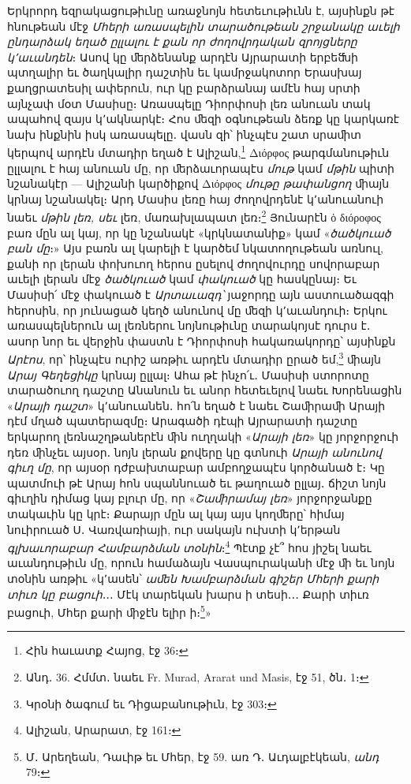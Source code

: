 \documentclass{article}
\begin{document}
{Երկրորդ եզրակացութիւնը առաջնոյն հետեւութիւնն է, այսինքն թէ հնութեան մէջ \emph{Մհերի առասպելին տարածութեան շրջանակը աւելի ընդարձակ եղած ըլլալու է քան որ ժողովրդական զրոյցները կ՚աւանդեն}։ Ասով կը ﬔրձենանք արդէն Այրարատի երբեﬓի պտղալիր եւ ծաղկալիր դաշտին եւ կամրջակոտոր Երասխայ քաղցրատեսիլ ափերուն, ուր կը բարձրանայ ամէն հայ սրտի այնչափ մօտ Մասիսը։ Առասպելը Դիորփոսի լեռ անուան տակ ապահով զայս կ՚ակնարկէ։ Հոս ﬔզի օգնութեան ձեռք կը կարկառէ նախ ինքնին իսկ առասպելը․ վասն զի՝ ինչպէս շատ սրաﬕտ կերպով արդէն մտադիր եղած է Ալիշան,\footnote{Հին հաւատք Հայոց, էջ 36։} Διόρφος թարգմանութիւն ըլլալու է հայ անուան մը, որ ﬔրձաւորապէս \emph{մութ} կամ \emph{մթին} պիտի նշանակէր — Ալիշանի կարծիքով Διόρφος \emph{մութը թափանցող} ﬕայն կրնայ նշանակել։ Արդ Մասիս լեռը հայ ժողովրդենէ կ՚անուանուի նաեւ \emph{մթին լեռ, սեւ} լեռ, մառախլապատ լեռ։\footnote{Անդ․ 36. Հմմտ․ նաեւ Fr. Murad, Ararat und Masis, էջ 51, ծն․ 1։} Յունարէն ὁ διόροφος բառ մըն ալ կայ, որ կը նշանակէ «կրկնատանիք» կամ «\emph{ծածկուած բան մը}։» Այս բառն ալ կարելի է կարծեմ նկատողութեան առնուլ, քանի որ լերան փոխուող հերոս ըսելով ժողովուրդը սովորաբար աւելի լերան մէջ \emph{ծածկուած} կամ \emph{փակուած} կը հասկընայ։ Եւ Մասիսի՛ մէջ փակուած է \emph{Արտաւազդ՝} յաջորդը այն աստուածազգի հերոսին, որ յունացած կեղծ անունով մը ﬔզի կ՚աւանդուի։ Երկու առասպելներուն ալ լեռներու նոյնութիւնը տարակոյսէ դուրս է․ ասոր նոր եւ վերջին փաստն է Դիորփոսի հակառակորդը՝ այսինքն \emph{Արէոս}, որ՝ ինչպէս ուրիշ առթիւ արդէն մտադիր ըրած եմ,\footnote{Կրօնի ծագում եւ Դիցաբանութիւն, էջ 303։} ﬕայն \emph{Արայ Գեղեցիկը} կրնայ ըլլալ։ Ահա թէ ինչո՛ւ․ Մասիսի ստորոտը տարածուող դաշտը Անանուն եւ անոր հետեւելով նաեւ Խորենացին «\emph{Արայի դաշտ}» կ՚անուանեն․ հո՛ն եղած է նաեւ Շաﬕրաﬕ Արայի դէմ մղած պատերազմը։ Արագածի դէպի Այրարատի դաշտը երկարող լեռնաշղթաներէն ﬕն ուղղակի «\emph{Արայի լեռ}» կը յորջորջուի դեռ ﬕնչեւ այսօր․ նոյն լերան քովերը կը գտնուի \emph{Արայի անունով գիւղ մը}, որ այսօր դժբախտաբար ամբողջապէս կործանած է։ Կը պատմուի թէ Արայ հոն սպաննուած եւ թաղուած ըլլայ․ ճիշտ նոյն գիւղին դիմաց կայ բլուր մը, որ «\emph{Շաﬕրամայ լեռ}» յորջորջանքը տակաւին կը կրէ։ Քարայր մըն ալ կայ այս կողﬔրը՝ հիմայ նուիրուած Ս․ Վառվառիայի, ուր սակայն ուխտի կ՚երթան \emph{գլխաւորաբար Համբարձման տօնին}։\footnote{Ալիշան, Արարատ, էջ 161։} Պէտք չէ՞ հոս յիշել նաեւ աւանդութիւն մը, որուն համաձայն Վասպուրականի մէջ ﬕ եւ նոյն տօնին առթիւ «կ՚ասեն՝ \emph{աﬔն Խամբարձման գիշեր Մհերի քարի տիւռ կը բացուի}․․․ Մէկ տարեկան խարս ի տեսի․․․ Քարի տիւռ բացուի, Մհեր քարի ﬕջէն ելիր ի։\footnote{Մ․ Արեղեան, Դաւիթ եւ Մհեր, էջ 59. առ Դ․ Աւդալբէկեան, \emph{անդ} 79։}»

}
\end{document}
